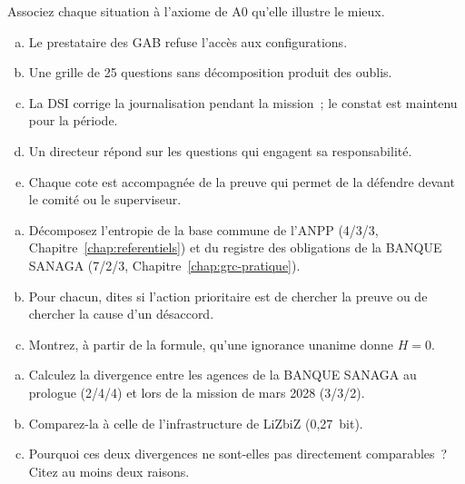 \begin{boxexo}[title={\ding{45}\quad Exercice~16.1. Quel axiome~? \niveaubase}]
Associez chaque situation à l'axiome de A0 qu'elle illustre le mieux.
\begin{enumerate}[(a)]
    \item Le prestataire des GAB refuse l'accès aux configurations.
    \item Une grille de 25 questions sans décomposition produit des oublis.
    \item La DSI corrige la journalisation pendant la mission~; le constat
          est maintenu pour la période.
    \item Un directeur répond \NEK{} sur les questions qui engagent sa
          responsabilité.
    \item Chaque cote est accompagnée de la preuve qui permet de la défendre
          devant le comité ou le superviseur.
\end{enumerate}
\end{boxexo}

\begin{boxexo}[title={\ding{45}\quad Exercice~16.2. Décomposer \niveaumoyen}]
\begin{enumerate}[(a)]
    \item Décomposez l'entropie de la base commune de l'ANPP (4/3/3,
          Chapitre~\ref{chap:referentiels}) et du registre des obligations de
          la BANQUE SANAGA (7/2/3, Chapitre~\ref{chap:grc-pratique}).
    \item Pour chacun, dites si l'action prioritaire est de chercher la
          preuve ou de chercher la cause d'un désaccord.
    \item Montrez, à partir de la formule, qu'une ignorance unanime donne
          $H = 0$.
\end{enumerate}
\end{boxexo}

\begin{boxexo}[title={\ding{45}\quad Exercice~16.3. Deux cycles \niveaumoyen}]
\begin{enumerate}[(a)]
    \item Calculez la divergence entre les agences de la BANQUE SANAGA au
          prologue (2/4/4) et lors de la mission de mars 2028 (3/3/2).
    \item Comparez-la à celle de l'infrastructure de LiZbiZ (0,27~bit).
    \item Pourquoi ces deux divergences ne sont-elles pas directement
          comparables~? Citez au moins deux raisons.
\end{enumerate}
\end{boxexo}

